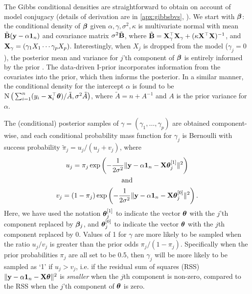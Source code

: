 \documentclass[showframe,11pt,twoside,openright]{report}
\begin{document}
The Gibbs conditional densities are straightforward to obtain on account of model conjugacy (details of derivation are in \cref{apx:gibbsbvs}, ).
We start with ${\bm\beta}$: the conditional density of ${\bm\beta}$ given $\alpha,\gamma,\sigma^2,\kappa$ is multivariate normal with mean $\tilde {{\mathbf B}}({\mathbf y}-\alpha{\mathbf 1}_n)$ and covariance matrix $\sigma^2\tilde {{\mathbf B}}$, where $\tilde {{\mathbf B}} = {\mathbf X}_\gamma^\top {\mathbf X}_\gamma + (\kappa \mathbf X^\top \mathbf X)^{-1}$, and ${\mathbf X}_\gamma = (\gamma_1X_1 \cdots \gamma_pX_p)$.
Interestingly, when $X_j$ is dropped from the model ($\gamma_j=0$), the posterior mean and variance for $j$'th component of ${\bm\beta}$ is entirely informed by the prior \citep{Kuo1998}.
The data-driven I-prior incorporates information from the covariates into the prior, which then informs the posterior.
In a similar manner, the conditional density for the intercept $\alpha$ is found to be $\operatorname{N}\big( \sum_{i=1}^n(y_i - {\mathbf x}_i^\top{\bm\theta}) / \tilde A,\sigma^2\tilde A \big)$, where $\tilde A = n + A^{-1}$ and $A$ is the prior variance for $\alpha$.

The (conditional) posterior samples of $\gamma=(\gamma_1,\dots,\gamma_p)$ are obtained component-wise, and each conditional probability mass function for $\gamma_j$ is Bernoulli  with success probability $\tilde \pi_j = u_j / (u_j + v_j)$, where
\begin{align*}
  \begin{gathered}
    u_j = \pi_j \exp\left( - \frac{1}{2\sigma^2} \Vert {\mathbf y} - \alpha {\mathbf 1}_n - {\mathbf X}{\bm\theta}_j^{[1]} \Vert^2 \right) \\
    \text{and} \\
    v_j = (1-\pi_j) \exp\left( - \frac{1}{2\sigma^2} \Vert {\mathbf y} - \alpha {\mathbf 1}_n - {\mathbf X}{\bm\theta}_j^{[0]} \Vert^2 \right).
  \end{gathered}
\end{align*}
Here, we have used the notation ${\bm\theta}_j^{[1]}$ to indicate the vector ${\bm\theta}$ with the $j$'th component replaced by ${\bm\beta}_j$, and ${\bm\theta}_j^{[0]}$ to indicate the vector ${\bm\theta}$ with the $j$th component replaced by 0.
Values of 1 for $\gamma$ are more likely to be sampled when the ratio $u_j / v_j$ is greater than the prior odds $\pi_j/(1-\pi_j)$.
Specifically when the prior probabilities $\pi_j$ are all set to be 0.5, then $\gamma_j$ will be more likely to be sampled as `1' if $u_j > v_j$, i.e. if the residual sum of squares (RSS) $\Vert {\mathbf y} - \alpha{\mathbf 1}_n - {\mathbf X}{\bm\theta} \Vert^2$ is \emph{smaller} when the $j$th component is non-zero, compared to the RSS when the $j$'th component of ${\bm\theta}$ is zero.
\end{document}
